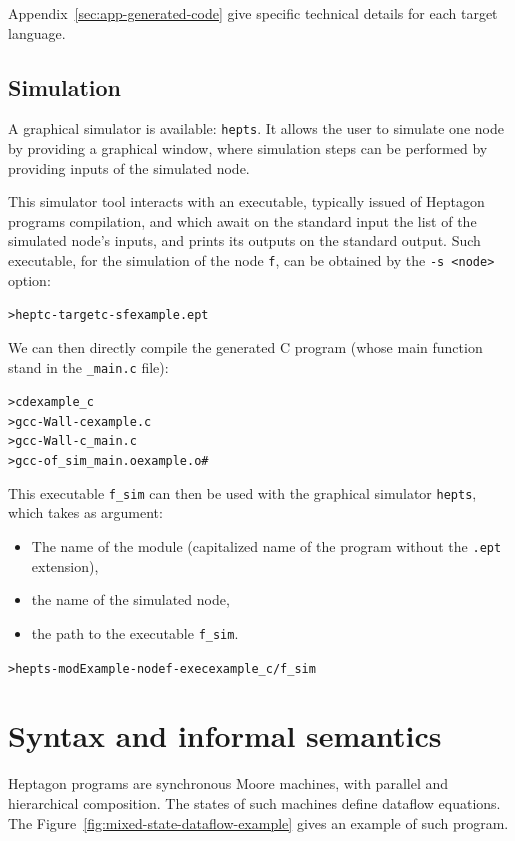 \documentclass[a4paper]{article}
\begin{document}
Appendix~\ref{sec:app-generated-code} give specific technical details for each target language.


\subsection{Simulation}
\label{sec:simulation}

A graphical simulator is available: \texttt{hepts}. It allows the user to simulate
one node by providing a graphical window, where simulation steps can be
performed by providing inputs of the simulated node.

This simulator tool interacts with an executable, typically issued of Heptagon
programs compilation, and which await on the standard input the list of the
simulated node's inputs, and prints its outputs on the standard output. Such
executable, for the simulation of the node \texttt{f}, can be obtained by the
\texttt{-s <node>} option:
\begin{alltt}
> heptc -target c -s f example.ept
\end{alltt}

We can then directly compile the generated C program (whose main function stand
in the \texttt{\_main.c} file):
\begin{alltt}
> cd example_c
> gcc -Wall -c example.c
> gcc -Wall -c _main.c
> gcc -o f_sim _main.o example.o       # 
\end{alltt}

This executable \texttt{f\_sim} can then be used with the graphical simulator
\texttt{hepts}, which takes as argument:
\begin{itemize}
\item The name of the module (capitalized name of the program without the
  \texttt{.ept} extension),
\item the name of the simulated node,
\item the path to the executable \texttt{f\_sim}.
\end{itemize}
\begin{alltt}
> hepts -mod Example -node f -exec example_c/f_sim
\end{alltt}

\section{Syntax and informal semantics}
\label{sec:synt-infor-sem}

Heptagon programs are synchronous Moore machines, with parallel and hierarchical
composition. The states of such machines define dataflow equations. The
Figure~\ref{fig:mixed-state-dataflow-example} gives an example of such program.
\end{document}
